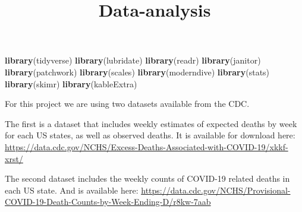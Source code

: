 \documentclass[
]{article}
\title{Data-analysis}
\author{}
\date{\vspace{-2.5em}}
\newenvironment{Shaded}{\begin{snugshade}}{\end{snugshade}}
\newcommand{\DataTypeTok}[1]{\textcolor[rgb]{0.13,0.29,0.53}{#1}}
\newcommand{\KeywordTok}[1]{\textcolor[rgb]{0.13,0.29,0.53}{\textbf{#1}}}
\newcommand{\NormalTok}[1]{#1}
\newcommand{\OperatorTok}[1]{\textcolor[rgb]{0.81,0.36,0.00}{\textbf{#1}}}
\newcommand{\StringTok}[1]{\textcolor[rgb]{0.31,0.60,0.02}{#1}}
\begin{document}
\maketitle

\begin{Shaded}
\begin{Highlighting}[]
\KeywordTok{library}\NormalTok{(tidyverse)}
\KeywordTok{library}\NormalTok{(lubridate)}
\KeywordTok{library}\NormalTok{(readr)}
\KeywordTok{library}\NormalTok{(janitor)}
\KeywordTok{library}\NormalTok{(patchwork)}
\KeywordTok{library}\NormalTok{(scales)}
\KeywordTok{library}\NormalTok{(moderndive)}
\KeywordTok{library}\NormalTok{(stats)}
\KeywordTok{library}\NormalTok{(skimr)}
\KeywordTok{library}\NormalTok{(kableExtra)}
\end{Highlighting}
\end{Shaded}

For this project we are using two datasets available from the CDC.

The first is a dataset that includes weekly estimates of expected deaths
by week for each US states, as well as observed deaths. It is available
for download here:
\url{https://data.cdc.gov/NCHS/Excess-Deaths-Associated-with-COVID-19/xkkf-xrst/}

\begin{Shaded}
\end{Shaded}

The second dataset includes the weekly counts of COVID-19 related deaths
in each US state. And is available here:
\url{https://data.cdc.gov/NCHS/Provisional-COVID-19-Death-Counts-by-Week-Ending-D/r8kw-7aab}
\end{document}
